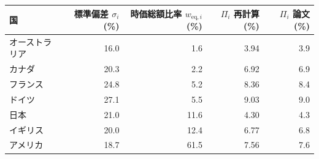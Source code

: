 \begin{tabular}{lrrrr}
\toprule
国 & 標準偏差 $\sigma_i$ (\%) & 時価総額比率 $w_{\mathrm{eq},i}$ (\%) & $\Pi_i$ 再計算 (\%) & $\Pi_i$ 論文 (\%) \\
\midrule
オーストラリア & 16.0 & 1.6 & 3.94 & 3.9 \\
カナダ & 20.3 & 2.2 & 6.92 & 6.9 \\
フランス & 24.8 & 5.2 & 8.36 & 8.4 \\
ドイツ & 27.1 & 5.5 & 9.03 & 9.0 \\
日本 & 21.0 & 11.6 & 4.30 & 4.3 \\
イギリス & 20.0 & 12.4 & 6.77 & 6.8 \\
アメリカ & 18.7 & 61.5 & 7.56 & 7.6 \\
\bottomrule
\end{tabular}
